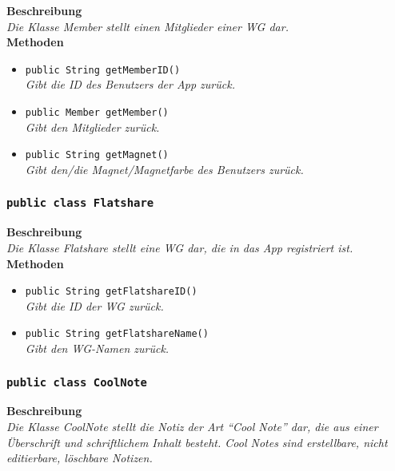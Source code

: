 	\textbf{Beschreibung} \\
	\textit{Die Klasse Member stellt einen Mitglieder einer WG dar.} \\

	\textbf{Methoden}
	\begin{itemize}
		\item\texttt{{public String getMemberID()}}\\
		\textit{Gibt die ID des Benutzers der App zurück.}\\
		\item\texttt{{public Member getMember()}}\\
		\textit{Gibt den Mitglieder zurück.}\\
		\item\texttt{{public String getMagnet()}}\\
		\textit{Gibt den/die Magnet/Magnetfarbe des Benutzers zurück.}\\
	\end{itemize}       

\subsubsection{\texttt{public class Flatshare}}

	\textbf{Beschreibung} \\
	\textit{Die Klasse Flatshare stellt eine WG dar, die in das App registriert ist.} \\

	\textbf{Methoden}
	\begin{itemize}
		\item\texttt{{public String getFlatshareID()}}\\
		\textit{Gibt die ID der WG zurück.}\\
		\item\texttt{{public String getFlatshareName()}}\\
		\textit{Gibt den WG-Namen zurück.}\\
	\end{itemize}

\subsubsection{\texttt{public class CoolNote}}

	\textbf{Beschreibung} \\
	\textit{Die Klasse CoolNote stellt die Notiz der Art “Cool Note” dar, die aus einer Überschrift und schriftlichem Inhalt besteht. Cool Notes sind erstellbare, nicht editierbare, löschbare Notizen.} \\

